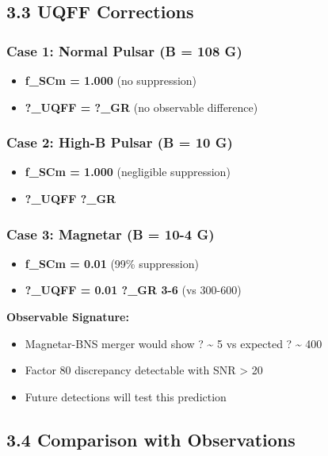 \documentclass[11pt]{article}
\begin{document}
\subsection*{3.3 UQFF Corrections}

\subsubsection*{Case 1: Normal Pulsar (B = 108 G)}

\begin{itemize}
  \item \textbf{f\_SCm = 1.000} (no suppression)
  \item \textbf{?\_UQFF = ?\_GR} (no observable difference)
\end{itemize}

\subsubsection*{Case 2: High-B Pulsar (B = 10 G)}

\begin{itemize}
  \item \textbf{f\_SCm = 1.000} (negligible suppression)
  \item \textbf{?\_UQFF  ?\_GR}
\end{itemize}

\subsubsection*{Case 3: Magnetar (B = 10-4 G)}

\begin{itemize}
  \item \textbf{f\_SCm = 0.01} (99\% suppression)
  \item \textbf{?\_UQFF = 0.01  ?\_GR  3-6} (vs 300-600)
\end{itemize}

\textbf{Observable Signature:}

\begin{itemize}
  \item Magnetar-BNS merger would show ? \textasciitilde{} 5 vs expected ? \textasciitilde{} 400
  \item Factor 80 discrepancy detectable with SNR > 20
  \item Future detections will test this prediction
\end{itemize}

\subsection*{3.4 Comparison with Observations}
\end{document}
